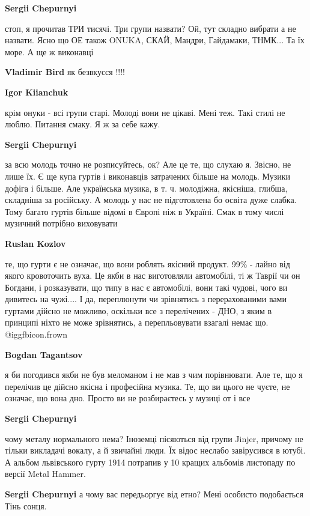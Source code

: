 \begin{itemize}
\begin{itemize}
\textbf{Sergii Chepurnyi} 

стоп, я прочитав ТРИ тисячі. Три групи назвати? Ой, тут складно вибрати а не
назвати. Ясно що ОЕ також ONUKA, СКАЙ, Мандри, Гайдамаки, ТНМК... Та їх море. А
ще ж виконавці

\textbf{Vladimir Bird} як безвкусся !!!!

\textbf{Igor Kiianchuk} 

крім онуки - всі групи старі. Молоді вони не цікаві. Мені теж. Такі стилі не
люблю. Питання смаку. Я ж за себе кажу.

\textbf{Sergii Chepurnyi} 

за всю молодь точно не розписуйтесь, ок? Але це те, що слухаю я. Звісно, не
лише їх. Є ще купа гуртів і виконавців затрачених більше на молодь. Музики
дофіга і більше. Але українська музика, в т. ч. молодіжна, якісніша, глибша,
складніша за російську. А молодь у нас не підготовлена бо освіта дуже слабка.
Тому багато гуртів більше відомі в Європі ніж в Україні. Смак в тому числі
музичний потрібно виховувати

\textbf{Ruslan Kozlov} 

те, що гурти є не означає, що вони роблять якісний продукт. 99\% - лайно від
якого кровоточить вуха. Це якби в нас виготовляли автомобілі, ті ж Таврії чи он
Богдани, і розказувати, що типу в нас є автомобілі, вони такі чудові, чого ви
дивитесь на чужі.... І да, переплюнути чи зрівнятись з перерахованими вами
гуртами дійсно не можливо, оскільки все з перелічених - ДНО, з яким в принципі
ніхто не може зрівнятись, а перепльовувати взагалі немає що.  @igg{fbicon.frown} 

\textbf{Bogdan Tagantsov} 

я би погодився якби не був меломаном і не мав з чим порівнювати. Але те, що я
перелічив це дійсно якісна і професійна музика. Те, що ви цього не чуєте, не
означає, що вона дно. Просто ви не розбираєтесь у музиці от і все


\textbf{Sergii Chepurnyi} 

чому металу нормального нема? Іноземці пісяються від групи Jinjer, причому не
тільки викладачі вокалу, а й звичайні люди. Їх відос неслабо завірусився в
ютубі. А альбом львівського гурту 1914 потрапив у 10 кращих альбомів листопаду
по версії Metal Hammer.


\textbf{Sergii Chepurnyi} а чому вас передьоргує від етно? Мені особисто подобається Тінь сонця.


\end{itemize}
\end{itemize}
